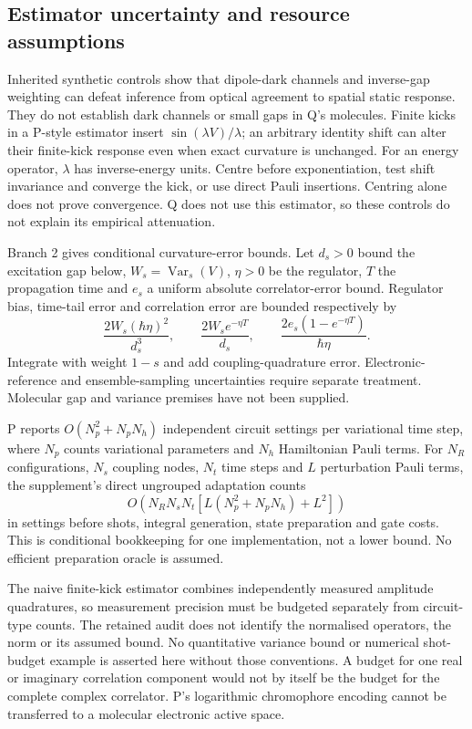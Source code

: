 \documentclass{article}
\begin{document}
\subsection{Estimator uncertainty and resource assumptions}

Inherited synthetic controls show that dipole-dark channels and inverse-gap weighting can defeat inference from optical agreement to spatial static response. They do not establish dark channels or small gaps in Q's molecules. Finite kicks in a P-style estimator insert $\sin(\lambda V)/\lambda$; an arbitrary identity shift can alter their finite-kick response even when exact curvature is unchanged. For an energy operator, $\lambda$ has inverse-energy units. Centre before exponentiation, test shift invariance and converge the kick, or use direct Pauli insertions. Centring alone does not prove convergence. Q does not use this estimator, so these controls do not explain its empirical attenuation.

Branch 2 gives conditional curvature-error bounds. Let $d_s>0$ bound the excitation gap below, $W_s=\operatorname{Var}_s(V)$, $\eta>0$ be the regulator, $T$ the propagation time and $e_s$ a uniform absolute correlator-error bound. Regulator bias, time-tail error and correlation error are bounded respectively by
\begin{equation*}
\frac{2W_s(\hbar\eta)^2}{d_s^3},\qquad
\frac{2W_s e^{-\eta T}}{d_s},\qquad
\frac{2e_s(1-e^{-\eta T})}{\hbar\eta}.
\end{equation*}
Integrate with weight $1-s$ and add coupling-quadrature error. Electronic-reference and ensemble-sampling uncertainties require separate treatment. Molecular gap and variance premises have not been supplied.

P reports $O(N_p^2+N_pN_h)$ independent circuit settings per variational time step, where $N_p$ counts variational parameters and $N_h$ Hamiltonian Pauli terms. For $N_R$ configurations, $N_s$ coupling nodes, $N_t$ time steps and $L$ perturbation Pauli terms, the supplement's direct ungrouped adaptation counts
\begin{equation*}
O\left(N_RN_sN_t\left[L(N_p^2+N_pN_h)+L^2\right]\right)
\end{equation*}
in settings before shots, integral generation, state preparation and gate costs. This is conditional bookkeeping for one implementation, not a lower bound. No efficient preparation oracle is assumed.

The naive finite-kick estimator combines independently measured amplitude quadratures, so measurement precision must be budgeted separately from circuit-type counts. The retained audit does not identify the normalised operators, the norm or its assumed bound. No quantitative variance bound or numerical shot-budget example is asserted here without those conventions. A budget for one real or imaginary correlation component would not by itself be the budget for the complete complex correlator. P's logarithmic chromophore encoding cannot be transferred to a molecular electronic active space.
\end{document}
